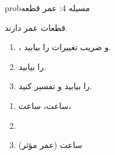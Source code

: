 \begin{PSbox}[unbreakable]{prob}{مسیله 4: عمر قطعه}

قطعات عمر  دارند.

\begin{enumerate}
\def\labelenumi{(\PSalph{enumi})}
\tightlist
\item
  ،  و ضریب تغییرات را بیابید.
\item
   را بیابید.
\item
   را بیابید و تفسیر کنید.
\end{enumerate}

\PSsolution{} 

\begin{enumerate}
\def\labelenumi{(\PSalph{enumi})}
\item
   ساعت،  ساعت، 
\item
\item
  \PSbr{} ساعت (عمر مؤثر)
\end{enumerate}

\end{PSbox}


